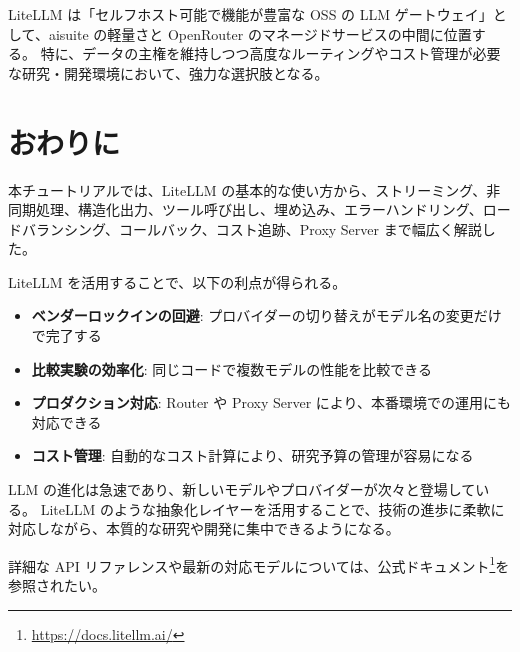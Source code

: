 \documentclass[a4paper,11pt]{ltjsarticle}
\begin{document}
\begin{tipbox}
LiteLLM は「セルフホスト可能で機能が豊富な OSS の LLM ゲートウェイ」として、aisuite の軽量さと OpenRouter のマネージドサービスの中間に位置する。
特に、データの主権を維持しつつ高度なルーティングやコスト管理が必要な研究・開発環境において、強力な選択肢となる。
\end{tipbox}


\section{おわりに}
\label{sec:conclusion}

本チュートリアルでは、LiteLLM の基本的な使い方から、ストリーミング、非同期処理、構造化出力、ツール呼び出し、埋め込み、エラーハンドリング、ロードバランシング、コールバック、コスト追跡、Proxy Server まで幅広く解説した。

LiteLLM を活用することで、以下の利点が得られる。

\begin{itemize}
  \item \textbf{ベンダーロックインの回避}: プロバイダーの切り替えがモデル名の変更だけで完了する
  \item \textbf{比較実験の効率化}: 同じコードで複数モデルの性能を比較できる
  \item \textbf{プロダクション対応}: Router や Proxy Server により、本番環境での運用にも対応できる
  \item \textbf{コスト管理}: 自動的なコスト計算により、研究予算の管理が容易になる
\end{itemize}

LLM の進化は急速であり、新しいモデルやプロバイダーが次々と登場している。
LiteLLM のような抽象化レイヤーを活用することで、技術の進歩に柔軟に対応しながら、本質的な研究や開発に集中できるようになる。

詳細な API リファレンスや最新の対応モデルについては、公式ドキュメント\footnote{\url{https://docs.litellm.ai/}}を参照されたい。
\end{document}
